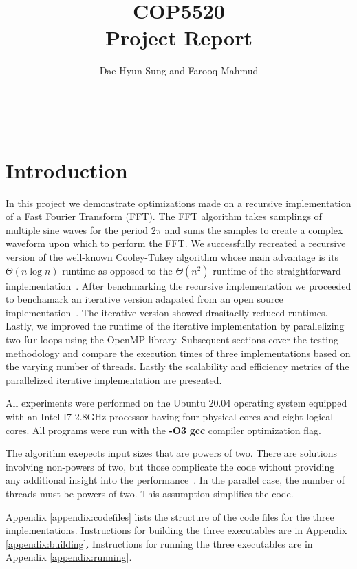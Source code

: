 \documentclass{amsart}
\begin{document}
\title{COP5520\\{\bf Project Report}}%
\author{Dae Hyun Sung and Farooq Mahmud}%
\date{}


\maketitle\

\section{Introduction}
In this project we demonstrate optimizations made on a recursive implementation of a Fast Fourier Transform (FFT). The FFT algorithm takes samplings of multiple sine waves for the period
$2\pi$ and sums the samples to create a complex waveform upon which to perform the FFT. We successfully recreated a recursive version of the well-known Cooley-Tukey algorithm whose main advantage is its $\Theta(n\log n)$ runtime as opposed to the $\Theta(n^{2})$ runtime of the straightforward implementation~\cite{cormen}. After benchmarking the recursive implementation we proceeded to benchamark an iterative version adapated from an open source implementation~\cite{rshuston}. The iterative version showed drasitaclly reduced runtimes. Lastly, we improved the runtime of the iterative implementation by parallelizing two  \textbf{for} loops using the OpenMP library. Subsequent sections cover the testing methodology and compare the execution times of three implementations based on the varying number of threads. Lastly the scalability and efficiency metrics of the parallelized iterative implementation are presented.

All experiments were performed on the Ubuntu 20.04 operating system equipped with an Intel I7 2.8GHz processor having four physical cores and eight logical cores. All programs were run with the \textbf{-O3} \textbf{gcc} compiler optimization flag.

The algorithm exepects input sizes that are powers of two. There are solutions involving non-powers of two, but those complicate the code without providing any additional insight into the performance~\cite{cormen}. In the parallel case, the number of threads must be powers of two. This assumption simplifies the code.

Appendix \ref{appendix:codefiles} lists the structure of the code files for the three implementations. Instructions for building the three executables are in Appendix \ref{appendix:building}. Instructions for running the three executables are in Appendix \ref{appendix:running}.
\end{document}
